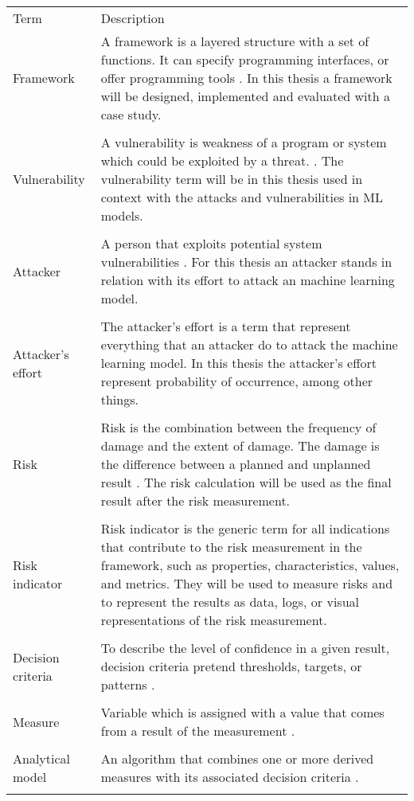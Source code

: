 \begin{center}
  \begin{tabular}{ |L{4cm}|L{10cm}|  }
    \hline
     Term & Description \\ [0.5ex]
    Framework & A framework is a layered structure with a set of functions. It can specify programming interfaces, or offer programming tools \cite{FIPS1402}. In this thesis a framework will be designed, implemented and evaluated with a case study. \\
    & \\
    \hline
    Vulnerability & A vulnerability is weakness of a program or system which could be exploited by a threat. \cite{FIPS1402}. The vulnerability term will be in this thesis used in context with the attacks and vulnerabilities in ML models. \\
    & \\
    \hline
    Attacker & A person that exploits potential system vulnerabilities \cite{FIPS1402}. For this thesis an attacker stands in relation with its effort to attack an machine learning model. \\
    & \\
    \hline
    Attacker's effort & The attacker's effort is a term that represent everything that an attacker do to attack the machine learning model. In this thesis the attacker's effort represent probability of occurrence, among other things. \\
    & \\
    \hline
    Risk & Risk is the combination between the frequency of damage and
    the extent of damage. The damage is the difference between a
    planned and unplanned result \cite{bsi_glossar_2021}. The risk calculation will be used as the final result after the risk measurement. \\
    & \\
    \hline
    Risk indicator & Risk indicator is the generic term for all indications that contribute to the risk measurement in the framework, such as properties, characteristics, values, and metrics. They will be used to measure risks and to represent the results as data, logs, or visual representations of the risk measurement. \\
    & \\
    \hline
    Decision criteria & To describe the level of confidence in a given result, decision criteria pretend thresholds, targets, or patterns \cite{ISO_27004_2009}. \\
    & \\
    \hline
    Measure & Variable which is assigned with a value that comes from a result of the measurement \cite{ISO_27004_2009}. \\
    & \\
    \hline
    Analytical model & An algorithm that combines one or more derived measures with its associated decision criteria \cite{ISO_27004_2009}. \\
    & \\
    \hline
  \end{tabular}
\end{center}

